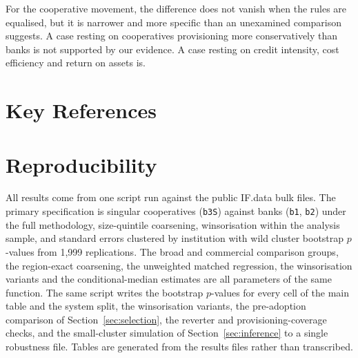 \documentclass[11pt,a4paper]{article}
\begin{document}
For the cooperative movement, the difference does not vanish when the rules are
equalised, but it is narrower and more specific than an unexamined comparison suggests. A
case resting on cooperatives provisioning more conservatively than banks is not supported
by our evidence. A case resting on credit intensity, cost efficiency and return on assets
is.

\section{Key References}

\renewcommand{\refname}{}
\vspace{-2.5em}



\appendix
\section{Reproducibility}

All results come from one script run against the public IF.data bulk files. The primary
specification is singular cooperatives (\texttt{b3S}) against banks (\texttt{b1},
\texttt{b2}) under the full methodology, size-quintile coarsening, winsorisation within
the analysis sample, and standard errors clustered by institution with wild cluster
bootstrap $p$-values from 1{,}999 replications. The broad and commercial comparison
groups, the region-exact coarsening, the unweighted matched regression, the winsorisation
variants and the conditional-median estimates are all parameters of the same function.
The same script writes the bootstrap $p$-values for every cell of the main table and the
system split, the winsorisation variants, the pre-adoption comparison of
Section~\ref{sec:selection}, the reverter and provisioning-coverage checks, and the
small-cluster simulation of Section~\ref{sec:inference} to a single robustness file.
Tables are generated from the results files rather than transcribed.
\end{document}
